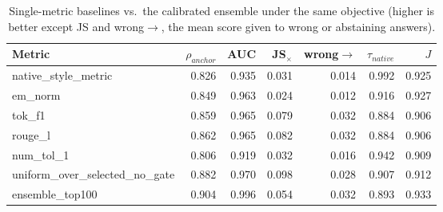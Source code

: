 \begin{table}[t]
\centering
\footnotesize
\caption{Single-metric baselines vs.\ the calibrated ensemble under the same objective (higher is better except JS and wrong$\to$, the mean score given to wrong or abstaining answers).}
\label{tab:baselines}

\begin{tabular}{lrrrrrr}
\toprule
Metric & $\rho_{anchor}$ & AUC & JS$_\times$ & wrong$\to$ & $\tau_{native}$ & $J$ \\
\midrule
native\_style\_metric & 0.826 & 0.935 & 0.031 & 0.014 & 0.992 & 0.925 \\
em\_norm & 0.849 & 0.963 & 0.024 & 0.012 & 0.916 & 0.927 \\
tok\_f1 & 0.859 & 0.965 & 0.079 & 0.032 & 0.884 & 0.906 \\
rouge\_l & 0.862 & 0.965 & 0.082 & 0.032 & 0.884 & 0.906 \\
num\_tol\_1 & 0.806 & 0.919 & 0.032 & 0.016 & 0.942 & 0.909 \\
uniform\_over\_selected\_no\_gate & 0.882 & 0.970 & 0.098 & 0.028 & 0.907 & 0.912 \\
ensemble\_top100 & 0.904 & 0.996 & 0.054 & 0.032 & 0.893 & 0.933 \\
\bottomrule
\end{tabular}

\end{table}